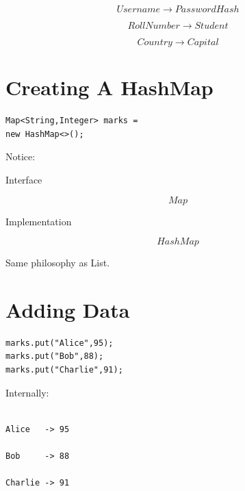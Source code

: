 \documentclass[11pt,a4paper]{book}
\begin{document}
\[
Username
\rightarrow
PasswordHash
\]


\[
RollNumber
\rightarrow
Student
\]


\[
Country
\rightarrow
Capital
\]


\section{Creating A HashMap}

\begin{verbatim} 
Map<String,Integer> marks =
new HashMap<>();
\end{verbatim}


Notice:


Interface

\[
Map
\]


Implementation

\[
HashMap
\]


Same philosophy as List.


\section{Adding Data}

\begin{verbatim} 
marks.put("Alice",95);
marks.put("Bob",88);
marks.put("Charlie",91);
\end{verbatim}


Internally:

\begin{verbatim}

Alice   -> 95

Bob     -> 88

Charlie -> 91

\end{verbatim}
\end{document}
